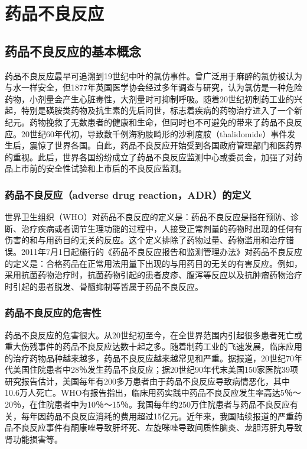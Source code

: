 \chapter{药品不良反应}

\section{药品不良反应的基本概念}

药品不良反应最早可追溯到19世纪中叶的氯仿事件。曾广泛用于麻醉的氯仿被认为与水一样安全，但1877年英国医学协会经过多年调查与研究，认为氯仿是一种危险药物，小剂量会产生心脏毒性，大剂量时可抑制呼吸。随着20世纪初制药工业的兴起，特别是磺胺类药物及抗生素的先后问世，标志着疾病的药物治疗进入了一个新纪元。药物挽救了无数患者的健康和生命，但同时也不可避免的带来了药品不良反应。20世纪60年代初，导致数千例海豹肢畸形的沙利度胺（thalidomide）事件发生后，震惊了世界各国。自此，药品不良反应开始受到各国政府管理部门和医药界的重视。此后，世界各国纷纷成立了药品不良反应监测中心或委员会，加强了对药品上市前的安全性试验和上市后的不良反应监测。

\subsection{药品不良反应（adverse drug reaction，ADR）的定义}

世界卫生组织（WHO）对药品不良反应的定义是：药品不良反应是指在预防、诊断、治疗疾病或者调节生理功能的过程中，人接受正常剂量的药物时出现的任何有伤害的和与用药目的无关的反应。这个定义排除了药物过量、药物滥用和治疗错误。2011年7月1日起施行的《药品不良反应报告和监测管理办法》对药品不良反应的定义是：合格药品在正常用法用量下出现的与用药目的无关的有害反应。例如，采用抗菌药物治疗时，抗菌药物引起的患者皮疹、腹泻等反应以及抗肿瘤药物治疗时引起的患者脱发、骨髓抑制等皆属于药品不良反应。

\subsection{药品不良反应的危害性}

药品不良反应的危害很大。从20世纪初至今，在全世界范围内引起很多患者死亡或重大伤残事件的药品不良反应达数十起之多。随着制药工业的飞速发展，临床应用的治疗药物品种越来越多，药品不良反应越来越常见和严重。据报道，20世纪70年代美国住院患者中28％发生药品不良反应；据20世纪90年代末美国150家医院39项研究报告估计，美国每年有200多万患者由于药品不良反应导致病情恶化，其中10.6万人死亡。WHO有报告指出，临床用药实践中药品不良反应发生率高达5％～20％，在住院患者中为10％～15％。我国每年约250万住院患者与药品不良反应有关，每年因药品不良反应消耗的费用超过15亿元。近年来，我国陆续报道的严重药品不良反应事件有酮康唑导致肝坏死、左旋咪唑导致间质性脑炎、龙胆泻肝丸导致肾功能损害等。

